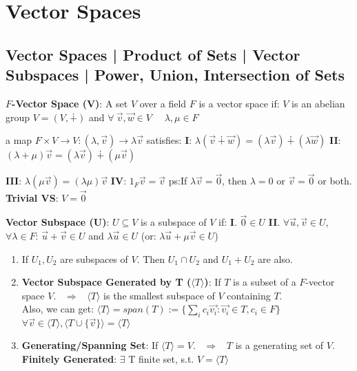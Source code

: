 \documentclass[9pt]{article}
\begin{document}
\section{Vector Spaces} %

\subsection{Vector Spaces | Product of Sets | Vector Subspaces | Power, Union, Intersection of Sets}

\textbf{$F$-Vector Space (V)}: A set $V$ over a field $F$ is a vector space if: \quad $V$ is an abelian group $V=(V,\dotplus)$ and $\forall \ \vec{v},\vec{w}\in V$ \ \ $\lambda,\mu\in F$

\quad \quad \quad \quad a map $F\times V\to V:(\lambda,\vec{v})\to\lambda\vec{v}$ satisfies: \textbf{I}: $\lambda(\vec{v}\dotplus\vec{w})=(\lambda\vec{v})\dotplus(\lambda\vec{w})$ \quad \textbf{II}: $(\lambda+\mu)\vec{v}=(\lambda\vec{v})\dotplus(\mu\vec{v})$

\quad \quad \quad \quad \textbf{III}: $\lambda(\mu\vec{v})=(\lambda\mu)\vec{v}$ \quad \textbf{IV}: $1_F\vec{v}=\vec{v}$ \hspace{30pt} {\scriptsize ps:If $\lambda\vec{v}=\vec{0}$, then $\lambda=0$ or $\vec{v}=\vec{0}$ or both. \hspace{30pt} \textbf{Trivial VS}: $V=\vec{0}$} 

\textbf{Vector Subspace (U)}: $U\subseteq V$ is a subspace of $V$ if: \quad \textbf{I}. $\vec{0}\in U$ \quad \textbf{II}. $\forall \vec{u},\vec{v}\in U$, $\forall \lambda\in F$: $\vec{u}+\vec{v}\in U$ and $\lambda\vec{u}\in U$ \quad (or: $\lambda\vec{u}+\mu\vec{v}\in U$)

\begin{enumerate}[itemsep=-2pt, topsep=-2pt]
    \item If $U_1,U_2$ are subspaces of $V$. Then $U_1\cap U_2$ and $U_1+U_2$ are also. 
    \item \textbf{Vector Subspace Generated by T ($\langle T \rangle$)}: {\small If $T$ is a subset of a $F$-vector space $V$. \ $\Rightarrow$ \ $\langle T \rangle$ is the smallest subspace of $V$ containing $T$.} \\
    \quad Also, we can get: $\langle T \rangle=span(T):=\{\sum_ic_i\vec{v_i}: \vec{v_i}\in T,c_i\in F\}$ \quad \quad \quad $\forall \vec{v}\in\langle T \rangle,\langle T \cup\{\vec{v}\}\rangle=\langle T \rangle$
    \item \textbf{Generating/Spanning Set}: If $\langle T \rangle=V$. \ $\Rightarrow$ \ $T$ is a generating set of $V$. \quad \textbf{Finitely Generated}: $\exists$ T finite set, s.t. $V=\langle T\rangle$
\end{enumerate}
\end{document}
